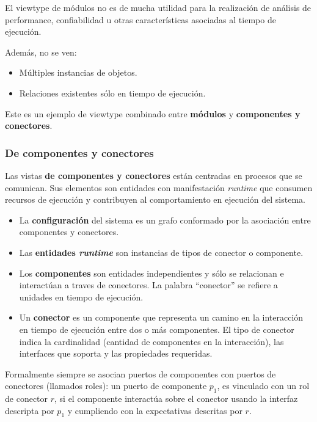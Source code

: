 \documentclass[]{article}
\begin{document}
El viewtype de módulos no es de mucha utilidad para la realización de análisis de performance, confiabilidad u otras características asociadas al tiempo de ejecución.

Además, no se ven:
\begin{itemize}
    \item Múltiples instancias de objetos.
    \item Relaciones existentes sólo en tiempo de ejecución.
\end{itemize}




Este es un ejemplo de viewtype combinado entre \textbf{módulos} y \textbf{componentes y conectores}.

\subsubsection{De componentes y conectores}
Las vistas \textbf{de componentes y conectores} están centradas en procesos que se comunican. Sus elementos son entidades con manifestación \emph{runtime} que consumen recursos de ejecución y contribuyen al comportamiento en ejecución del sistema.

\begin{itemize}
    \item La \textbf{configuración} del sistema es un grafo conformado por la asociación entre componentes y conectores.
    \item Las \textbf{entidades \emph{runtime}} son instancias de tipos de conector o componente.
    \item Los \textbf{componentes} son entidades independientes y sólo se relacionan e interactúan a traves de conectores. La palabra ``conector'' se refiere a unidades en tiempo de ejecución.
    \item Un \textbf{conector} es un componente que representa un camino en la interacción en tiempo de ejecución entre dos o más componentes. El tipo de conector indica la cardinalidad (cantidad de componentes en la interacción), las interfaces que soporta y las propiedades requeridas.
\end{itemize}

Formalmente siempre se asocian puertos de componentes con puertos de conectores (llamados roles): un puerto de componente $p_1$, es vinculado con un rol de conector $r$, si el componente interactúa sobre el conector usando la interfaz descripta por $p_1$ y cumpliendo con la expectativas descritas por $r$.
\end{document}
